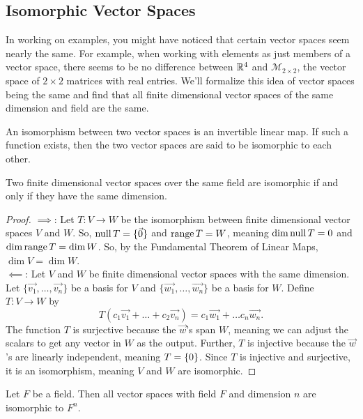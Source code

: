 \subsection{Isomorphic Vector Spaces}

In working on examples, you might have noticed that certain vector spaces seem nearly the same.
For example, when working with elements as just members of a vector space, there seems to be no difference between $\mathbb{R}^4$ and $\mathcal{M}_{2 \times 2}$, the vector space of $2 \times 2$ matrices with real entries.
We'll formalize this idea of vector spaces being the same and find that all finite dimensional vector spaces of the same dimension and field are the same.

\begin{definition}
	An isomorphism between two vector spaces is an invertible linear map.
	If such a function exists, then the two vector spaces are said to be isomorphic to each other.
\end{definition}

\begin{theorem}
	Two finite dimensional vector spaces over the same field are isomorphic if and only if they have the same dimension.
\end{theorem}
\begin{proof}
	$\implies$: Let $T: V \to W$ be the isomorphism between finite dimensional vector spaces $V$ and $W$.
	So, $\operatorname{null}{T} = \{\vec{0}\}$ and $\operatorname{range}{T} = W$, meaning $\dim{\operatorname{null}{T}} = 0$ and $\dim{\operatorname{range}{T}} = \dim{W}$.
	So, by the Fundamental Theorem of Linear Maps, $\dim{V} = \dim{W}$. \\
	
	$\impliedby$: Let $V$ and $W$ be finite dimensional vector spaces with the same dimension.
	Let $\{\vec{v_1}, \dots, \vec{v_n}\}$ be a basis for $V$ and $\{\vec{w_1}, \dots, \vec{w_n}\}$ be a basis for $W$.
	Define $T: V \to W$ by
	\begin{equation*}
		T(c_1\vec{v_1} + \dots + c_2\vec{v_n}) = c_1\vec{w_1} + \dots c_n\vec{w_n}.
	\end{equation*}
	The function $T$ is surjective because the $\vec{w}$'s span $W$, meaning we can adjust the scalars to get any vector in $W$ as the output.
	Further, $T$ is injective because the $\vec{w}$'s are linearly independent, meaning $\null{T} = \{0\}$.
	Since $T$ is injective and surjective, it is an isomorphism, meaning $V$ and $W$ are isomorphic.
\end{proof}

\begin{corollary}
	Let $F$ be a field.
	Then all vector spaces with field $F$ and dimension $n$ are isomorphic to $F^n$.
\end{corollary}

